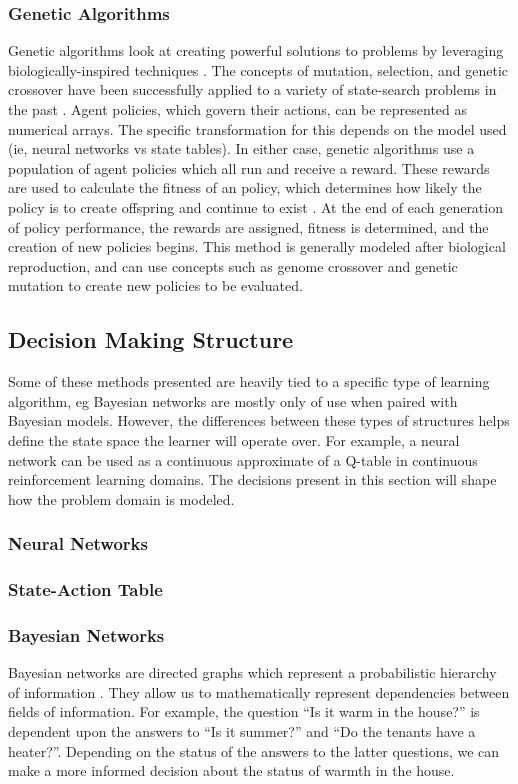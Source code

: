 \subsubsection{Genetic Algorithms}
Genetic algorithms look at creating powerful solutions to problems by leveraging biologically-inspired techniques \cite{RussellNorvig}.
The concepts of mutation, selection, and genetic crossover have been successfully applied to a variety of state-search problems in the past \cite{RussellNorvig}.
Agent policies, which govern their actions, can be represented as numerical arrays.
The specific transformation for this depends on the model used (ie, neural networks vs state tables).
In either case, genetic algorithms use a population of agent policies which all run and receive a reward.
These rewards are used to calculate the fitness of an policy, which determines how likely the policy is to create offspring and continue to exist \cite{RussellNorvig}.
At the end of each generation of policy performance, the rewards are assigned, fitness is determined, and the creation of new policies begins.
This method is generally modeled after biological reproduction, and can use concepts such as genome crossover and genetic mutation to create new policies to be evaluated.

\subsection{Decision Making Structure}
Some of these methods presented are heavily tied to a specific type of learning algorithm, eg Bayesian networks are mostly only of use when paired with Bayesian models.
However, the differences between these types of structures helps define the state space the learner will operate over.
For example, a neural network can be used as a continuous approximate of a Q-table in continuous reinforcement learning domains.
The decisions present in this section will shape how the problem domain is modeled.
\subsubsection{Neural Networks}
\subsubsection{State-Action Table}
\subsubsection{Bayesian Networks}
Bayesian networks are directed graphs which represent a probabilistic hierarchy of information \cite{RussellNorvig}.
They allow us to mathematically represent dependencies between fields of information.
For example, the question ``Is it warm in the house?'' is dependent upon the answers to ``Is it summer?'' and ``Do the tenants have a heater?''.
Depending on the status of the answers to the latter questions, we can make a more informed decision about the status of warmth in the house.

